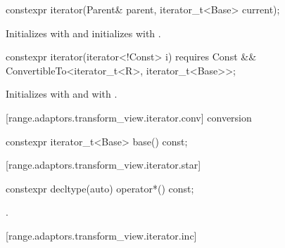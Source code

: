 \begin{itemdecl}
constexpr iterator(Parent& parent, iterator_t<Base> current);
\end{itemdecl}

\begin{itemdescr}
\pnum
\effects Initializes  with  and
initializes  with .
\end{itemdescr}

%
\begin{itemdecl}
constexpr iterator(iterator<!Const> i)
  requires Const && ConvertibleTo<iterator_t<R>, iterator_t<Base>>;
\end{itemdecl}

\begin{itemdescr}
\pnum
\effects Initializes  with  and 
with .
\end{itemdescr}

[range.adaptors.transform_view.iterator.conv]{ conversion}

\begin{itemdecl}
constexpr iterator_t<Base> base() const;
\end{itemdecl}

\begin{itemdescr}
\pnum
\oldtxt{\returns}  
\end{itemdescr}

[range.adaptors.transform_view.iterator.star]{}

\begin{itemdecl}
constexpr decltype(auto) operator*() const;
\end{itemdecl}

\begin{itemdescr}
\pnum
\returns {}.
\end{itemdescr}

[range.adaptors.transform_view.iterator.inc]{}

